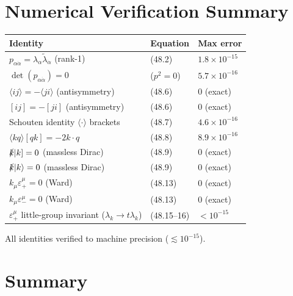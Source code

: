 
\section{Numerical Verification Summary}

\begin{center}
\renewcommand{\arraystretch}{1.5}
\begin{tabular}{@{}lll@{}}
  \toprule
  Identity & Equation & Max error \\
  \midrule
  $p_{\alpha\dot\alpha} = \lambda_\alpha\tilde\lambda_{\dot\alpha}$ (rank-1)
    & (48.2) & $1.8\times10^{-15}$ \\
  $\det(p_{\alpha\dot\alpha}) = 0$
    & ($p^2=0$) & $5.7\times10^{-16}$ \\
  $\langle ij\rangle = -\langle ji\rangle$ (antisymmetry)
    & (48.6) & $0$ (exact) \\
  $[ij] = -[ji]$ (antisymmetry)
    & (48.6) & $0$ (exact) \\
  Schouten identity $\langle\cdot\rangle$ brackets
    & (48.7) & $4.6\times10^{-16}$ \\
  $\langle kq\rangle[qk] = -2k\cdot q$
    & (48.8) & $8.9\times10^{-16}$ \\
  $\slashed{k}|k] = 0$ (massless Dirac)
    & (48.9) & $0$ (exact) \\
  $\slashed{k}|k\rangle = 0$ (massless Dirac)
    & (48.9) & $0$ (exact) \\
  $k_\mu\varepsilon_+^\mu = 0$ (Ward)
    & (48.13) & $0$ (exact) \\
  $k_\mu\varepsilon_-^\mu = 0$ (Ward)
    & (48.13) & $0$ (exact) \\
  $\varepsilon_+^\mu$ little-group invariant ($\lambda_k\to t\lambda_k$)
    & (48.15--16) & $< 10^{-15}$ \\
  \bottomrule
\end{tabular}
\end{center}

All identities verified to machine precision ($\lesssim 10^{-15}$).

\section{Summary}

